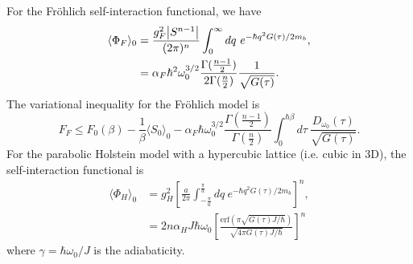 
For the Fr\"ohlich self-interaction functional, we have
\begin{equation}
    \begin{aligned}
        \langle\Phi_F\rangle_0 &= \frac{g^2_F \abs{S^{n-1}}}{(2\pi)^n} \int_0^{\infty} dq\ e^{-\hbar q^2 G(\tau) / 2 m_b} , \\
        &= \alpha_F \hbar^2 \omega_0^{3/2} \frac{\Gamma(\frac{n-1}{2})}{2 \Gamma(\frac{n}{2})} \frac{1}{\sqrt{G(\tau)}}.
    \end{aligned}
\end{equation}
The variational inequality for the Fr\"ohlich model is 
\begin{equation}
        F_F \leq F_0(\beta) -\frac{1}{\beta} \langle S_0 \rangle_0 - \alpha_F \hbar \omega_0^{3/2} \frac{\Gamma\left(\frac{n-1}{2}\right)}{\Gamma(\frac{n}{2})} \int_0^{\hbar\beta} d\tau\ \frac{D_{\omega_0}(\tau)}{\sqrt{G(\tau)}} .
\end{equation}
For the parabolic Holstein model with a hypercubic lattice (i.e. cubic in 3D),
the self-interaction functional is  
\begin{equation}
    \begin{aligned}
        \langle \Phi_H \rangle_0 &= g^2_H \left[\frac{a}{2\pi} \int_{-\frac{\pi}{a}}^{\frac{\pi}{a}} dq\ e^{-\hbar q^2 G(\tau) / 2 m_b}\right]^n , \\
        &= 2 n \alpha_H J \hbar \omega_0 \left[\frac{\text{erf}\left(\pi \sqrt{G(\tau) J/\hbar} \right)}{\sqrt{4\pi G(\tau)J/\hbar}}\right]^n
    \end{aligned}
\end{equation}
where $\gamma = \hbar\omega_0 / J$ is the adiabaticity. 

